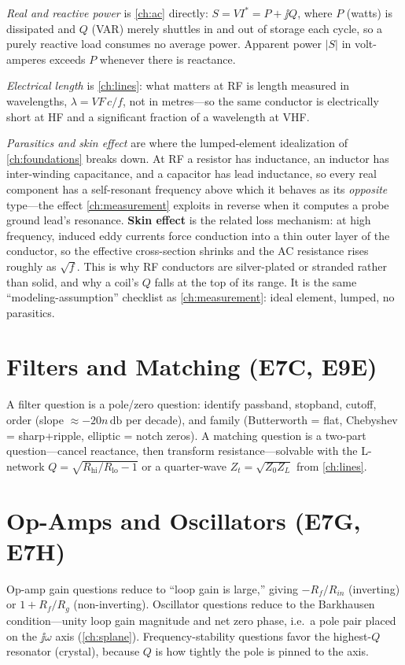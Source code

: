 \emph{Real and reactive power} is \cref{ch:ac} directly: \(S=VI^{*}=P+\jj Q\), where
\(P\) (watts) is dissipated and \(Q\) (VAR) merely shuttles in and out of storage each
cycle, so a purely reactive load consumes no average power. Apparent power \(|S|\) in
volt-amperes exceeds \(P\) whenever there is reactance.

\emph{Electrical length} is \cref{ch:lines}: what matters at RF is length measured in
wavelengths, \(\lambda=VF\,c/f\), not in metres---so the same conductor is
electrically short at HF and a significant fraction of a wavelength at VHF.

\emph{Parasitics and skin effect} are where the lumped-element idealization of
\cref{ch:foundations} breaks down. At RF a resistor has inductance, an inductor has
inter-winding capacitance, and a capacitor has lead inductance, so every real
component has a self-resonant frequency above which it behaves as its \emph{opposite}
type---the effect \cref{ch:measurement} exploits in reverse when it computes a probe
ground lead's resonance. \textbf{Skin effect} is the related loss mechanism: at high
frequency, induced eddy currents force conduction into a thin outer layer of the
conductor, so the effective cross-section shrinks and the AC resistance rises roughly
as \(\sqrt f\). This is why RF conductors are silver-plated or stranded rather than
solid, and why a coil's \(Q\) falls at the top of its range. It is the same
``modeling-assumption'' checklist as \cref{ch:measurement}: ideal element, lumped, no
parasitics.

\section{Filters and Matching (E7C, E9E)}
A filter question is a pole/zero question: identify passband, stopband, cutoff,
order (slope \(\approx-20n\,\si{\decibel}\) per decade), and family
(Butterworth = flat, Chebyshev = sharp+ripple, elliptic = notch zeros). A
matching question is a two-part question---cancel reactance, then transform
resistance---solvable with the L-network \(Q=\sqrt{R_{\text{hi}}/R_{\text{lo}}-1}\)
or a quarter-wave \(Z_t=\sqrt{Z_0Z_L}\) from \cref{ch:lines}.

\section{Op-Amps and Oscillators (E7G, E7H)}
Op-amp gain questions reduce to ``loop gain is large,'' giving
\(-R_f/R_{in}\) (inverting) or \(1+R_f/R_g\) (non-inverting). Oscillator questions
reduce to the Barkhausen condition---unity loop gain magnitude and net zero
phase, i.e.\ a pole pair placed on the \(\jj\omega\) axis
(\cref{ch:splane}). Frequency-stability questions favor the highest-\(Q\)
resonator (crystal), because \(Q\) is how tightly the pole is pinned to the axis.

